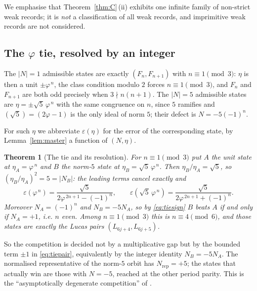 \documentclass[11pt]{article}
\newtheorem{theorem}{Theorem}[section]
\theoremstyle{definition}
\theoremstyle{remark}
\begin{document}
We emphasise that Theorem~\ref{thm:C}\,(ii) exhibits one infinite family of non-strict weak
records; it is \emph{not} a classification of all weak records, and imprimitive weak records are
not considered.

\subsection{\texorpdfstring{The $\varphi$ tie, resolved by an integer}{The phi tie, resolved by an integer}}\label{sec:tie}

The $|N|=1$ admissible states are exactly $(F_n,F_{n+1})$ with $n\equiv1\pmod3$: $\eta$ is then
a unit $\pm\varphi^{\,n}$, the class condition modulo $2$ forces $n\equiv1\pmod3$, and $F_n$ and
$F_{n+1}$ are both odd precisely when $3\nmid n(n+1)$. The $|N|=5$ admissible states are
$\eta=\pm\sqrt5\,\varphi^{\,n}$ with the same congruence on $n$, since $5$ ramifies and
$(\sqrt5)=(2\varphi-1)$ is the only ideal of norm $5$; their defect is $N=-5(-1)^n$.

For such $\eta$ we abbreviate $\varepsilon(\eta)$ for the error of the corresponding state, by
Lemma~\ref{lem:master} a function of $(N,\eta)$.

\begin{theorem}[The tie and its resolution]\label{thm:tie}
For $n\equiv1\pmod3$ put $A$ the unit state at $\eta_A=\varphi^{\,n}$ and $B$ the norm-$5$ state
at $\eta_B=\sqrt5\,\varphi^{\,n}$. Then $\eta_B/\eta_A=\sqrt5$, so
$(\eta_B/\eta_A)^2=5=|N_B|$: the leading terms cancel exactly and
\begin{equation}\label{eq:tiepair}
\varepsilon(\varphi^{\,n})=\frac{\sqrt5}{2\varphi^{\,2n+1}-(-1)^n},\qquad
\varepsilon(\sqrt5\,\varphi^{\,n})=\frac{\sqrt5}{2\varphi^{\,2n+1}+(-1)^n}.
\end{equation}
Moreover $N_A=(-1)^n$ and $N_B=-5N_A$, so by \eqref{eq:tiesign} $B$ beats $A$ if and only if
$N_A=+1$, i.e. $n$ even. Among $n\equiv1\pmod3$ this is $n\equiv4\pmod6$, and those states are
exactly the Lucas pairs $(L_{6j+4},L_{6j+5})$.
\end{theorem}

So the competition is decided not by a multiplicative gap but by the bounded term $\pm1$ in
\eqref{eq:tiepair}, equivalently by the integer identity $N_B=-5N_A$. The normalised
representative of the norm-$5$ orbit has $N_{\mathrm{rep}}=+5$; the states that actually win are
those with $N=-5$, reached at the other period parity. This is the ``asymptotically degenerate
competition'' of \cite[Remark 5.10]{DeJesus2026}.
\end{document}
